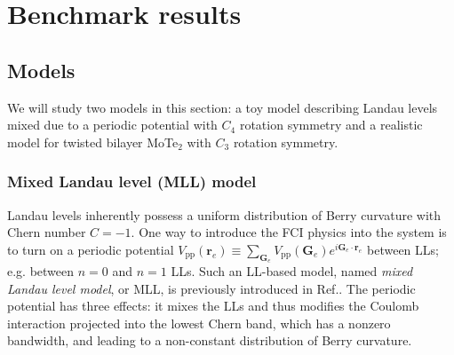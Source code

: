 \section{Benchmark results}\label{sec:benchmark}
\subsection{Models}
We will study two models in this section: a toy model describing Landau levels mixed due to a periodic potential with $C_4$ rotation symmetry and a realistic model for twisted bilayer MoTe$_2$ with $C_3$ rotation symmetry.
\subsubsection{Mixed Landau level (MLL) model}
Landau levels inherently possess a uniform distribution of Berry curvature with Chern number $C=-1$. One way to introduce the FCI physics into the system is to turn on a periodic potential $V_{\text{pp}}(\mathbf{r}_e)\equiv\sum_{\mathbf{G}_e} V_{\text{pp}}(\mathbf{G}_e)e^{i\mathbf{G}_e\cdot\mathbf{r}_e}$ between LLs; e.g. between $n=0$ and $n=1$ LLs. Such an LL-based model, named \emph{mixed Landau level model}, or MLL, is previously introduced in Ref.\cite{murthy2012hamiltonian}. The periodic potential has three effects: it mixes the LLs and thus modifies the Coulomb interaction projected into the lowest Chern band, which has a nonzero bandwidth, and leading to a non-constant distribution of Berry curvature. 

